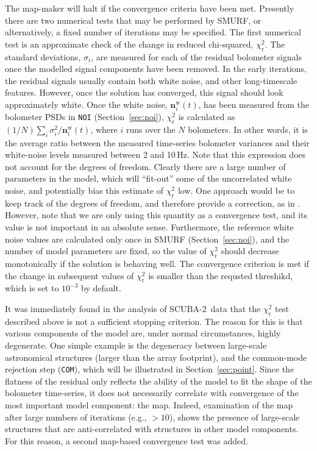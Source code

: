 \documentclass[useAMS,usenatbib,nofootinbib]{mn2e}
\newcommand{\scuba}{SCUBA-2}
\newcommand{\model}[1]{\texttt{#1}}
\begin{document}
The map-maker will halt if the convergence criteria have been
met. Presently there are two numerical tests that may be performed by
SMURF, or alternatively, a fixed number of iterations may be
specified. The first numerical test is an approximate check of the
change in reduced chi-squared, $\chi^2_\mathrm{r}$. The standard
deviations, $\sigma_i$, are measured for each of the residual
bolometer signals once the modelled signal components have been
removed. In the early iterations, the residual signals usually contain
both white noise, and other long-timescale features. However, once the
solution has converged, this signal should look approximately
white. Once the white noise, $\mathbf{n}^\mathrm{w}_i(t)$, has been
measured from the bolometer PSDs in \model{NOI}
(Section~\ref{sec:noi}), $\chi^2_\mathrm{r}$ is calculated as $(1/N)
\sum_i \sigma^2_i / \mathbf{n}^\mathrm{w}_i(t)$, where $i$ runs over
the $N$ bolometers. In other words, it is the average ratio between
the measured time-series bolometer variances and their white-noise
levels measured between 2 and 10\,Hz. Note that this expression does
not account for the degrees of freedom. Clearly there are a large
number of parameters in the model, which will ``fit-out'' some of the
uncorrelated white noise, and potentially bias this estimate of
$\chi^2_\mathrm{r}$ low. One approach would be to keep track of the
degrees of freedom, and therefore provide a correction, as in
\citet{kovacs2008}. However, note that we are only using this quantity
as a convergence test, and its value is not important in an absolute
sense. Furthermore, the reference white noise values are calculated
only once in SMURF (Section~\ref{sec:noi}), and the number of model
parameters are fixed, so the value of $\chi^2_\mathrm{r}$ should
decrease monotonically if the solution is behaving well. The
convergence criterion is met if the change in subsequent values of
$\chi^2_\mathrm{r}$ is smaller than the requsted threshikd, which is
set to $10^{-3}$ by default.

It was immediately found in the analysis of \scuba\ data that the
$\chi^2_\mathrm{r}$ test described above is not a sufficient stopping
criterion. The reason for this is that various components of the model
are, under normal circumstances, highly degenerate. One simple example
is the degeneracy between large-scale astronomical structures (larger
than the array footprint), and the common-mode rejection step
(\model{COM}), which will be illustrated in
Section~\ref{sec:point}. Since the flatness of the residual only
reflects the ability of the model to fit the shape of the bolometer
time-series, it does not necessarily correlate with convergence of the
most important model component: the map. Indeed, examination of the
map after large numbers of iterations (e.g., $>10$), shows the
presence of large-scale structures that are anti-correlated with
structures in other model components. For this reason, a second
map-based convergence test was added.
\end{document}
